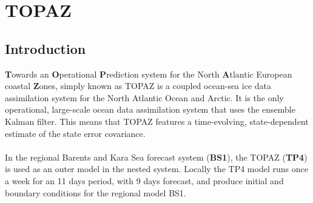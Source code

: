 \documentclass[12pt,a4paper]{report}
\begin{document}
\section{TOPAZ}
\subsection{Introduction}
\textbf{T}owards an \textbf{O}perational \textbf{P}rediction system for the North \textbf{A}tlantic European coastal \textbf{Z}ones, simply known as TOPAZ is a coupled ocean-sea ice data assimilation system for the North Atlantic Ocean and Arctic. It is the only operational, large-scale ocean data assimilation system that uses the ensemble Kalman filter. This means that TOPAZ features a time-evolving, state-dependent estimate of the state error covariance. \\ \\
In the regional Barents and Kara Sea forecast system (\textbf{BS1}), the TOPAZ (\textbf{TP4}) is used as an outer model in the nested system. Locally the TP4 model runs once a week for an 11 days period, with 9 days forecast, and produce initial and boundary conditions for the regional model BS1.
\end{document}
